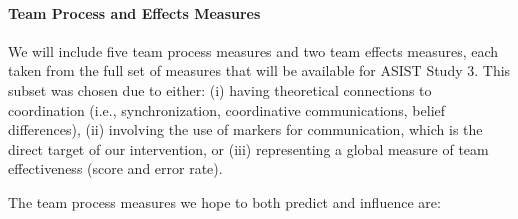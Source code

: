 \paragraph{Team Process and Effects Measures} We will include five team process
measures and two team effects measures, each taken from the full set of
measures that will be available for ASIST Study 3. This subset was chosen due
to either: (i) having theoretical connections to coordination (i.e.,
synchronization, coordinative communications, belief differences), (ii)
involving the use of markers for communication, which is the direct target of
our intervention, or (iii)
representing a global measure of team effectiveness (score and error rate).

\noindent The team process measures we hope to both predict and influence are:

